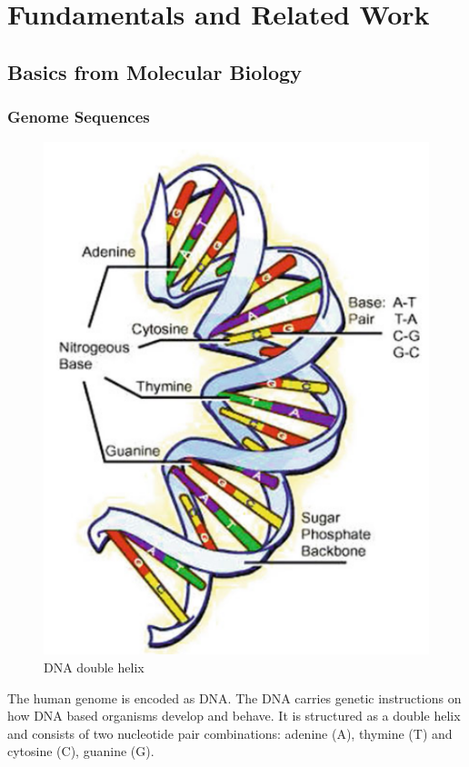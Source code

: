 \section{Fundamentals and Related Work} \label{fundamentals}

\subsection{Basics from Molecular Biology} \label{fundamentalsA}

\subsubsection{Genome Sequences} \label{fundamentalsAa}

\begin{figure}
	\centering
	\includegraphics[width=0.9\linewidth]{figures/dnaDoubleHelix.png}
	\caption{\ac{DNA} double helix \cite[p. 8]{10.5555/1965281}}
	\label{dna_double_helix}
\end{figure}

The human genome is encoded as \ac{DNA}. The \ac{DNA} carries genetic instructions on how \ac{DNA} based organisms develop and behave. It is structured as a double helix and consists of two nucleotide pair combinations: adenine (A), thymine (T) and cytosine (C), guanine (G). \cite[p. 8]{10.5555/1965281}

